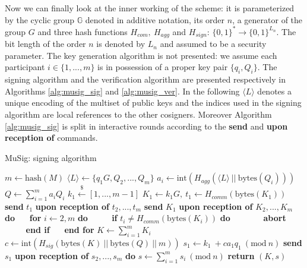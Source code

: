 \bigskip
\noindent
Now we can finally look at the inner working of the scheme: it is parameterized by the cyclic group $\mathbb{G}$ denoted in additive notation, its order $n$, a generator of the group $G$ and three hash functions $H_{com}, \ H_{agg}$ and $H_{sign}$: $\{0, 1\}^* \to \{0, 1\}^{L_n}$. The bit length of the order $n$ is denoted by $L_n$ and assumed to be a security parameter. The key generation algorithm is not presented: we assume each participant $i \in \{1, ..., m\}$ is in possession of a proper key pair $\{q_i, Q_i\}$. The signing algorithm and the verification algorithm are presented respectively in Algorithms \ref{alg:musig_sig} and \ref{alg:musig_ver}. In the following $\langle L \rangle$ denotes a unique encoding of the multiset of public keys and the indices used in the signing algorithm are local references to the other cosigners. Moreover Algorithm \ref{alg:musig_sig} is split in interactive rounds according to the \textbf{send} and \textbf{upon reception of} commands.

\bigskip

\begin{algorithm}
	\caption{MuSig: signing algorithm}
	\label{alg:musig_sig}
	\begin{algorithmic}[1]
		\State $m \gets \text{hash}(M)$
		\State $\langle L \rangle \gets \{q_1G, Q_2, ..., Q_m\}$
		\State $a_i \gets \text{int}(H_{agg}(\langle L \rangle \ || \ \text{bytes}(Q_i)))$
		\EndFor
		\State $Q \gets \sum_{i = 1}^{m}a_iQ_i$
		\State $k_1 \xleftarrow{\text{\$}} [1, ..., m - 1]$
		\State $K_1 \gets k_1G, \ t_1 \gets H_{comm}(\text{bytes}(K_1))$
		\State \textbf{send} $t_1$
		\State \textbf{upon reception of} $t_2, ..., t_m$ \textbf{send} $K_1$
		\State \textbf{upon reception of} $K_2, ..., K_m$ \textbf{do}
		\State $\ \ \ \ \ $ \textbf{for} $i \gets 2, m$ \textbf{do}
		\State $\ \ \ \ \ \ \ \ \ \ $ \textbf{if} $t_i \neq H_{comm}(\text{bytes}(K_i))$ \textbf{do}
		\State $\ \ \ \ \ \ \ \ \ \ \ \ \ \ \ $ \textbf{abort}
		\State $\ \ \ \ \ \ \ \ \ \ $ \textbf{end if}
		\State $\ \ \ \ \ $ \textbf{end for} 
		\State $K \gets \sum_{i = 1}^{m}K_i$
		\State $c \gets \text{int}(H_{sig}(\text{bytes}(K) \ || \ \text{bytes}(Q) \ || \ m))$
		\State $s_1 \gets k_1\ + ca_1q_1 \ (\text{mod} \ n)$
		\State \textbf{send} $s_1$
		\State \textbf{upon reception of} $s_2, ..., s_m$ \textbf{do}
		\State $s \gets \sum_{i = 1}^{m}s_i \ (\text{mod} \ n)$
		\State \textbf{return} $(K, s)$
		\EndProcedure
	\end{algorithmic}
\end{algorithm}

